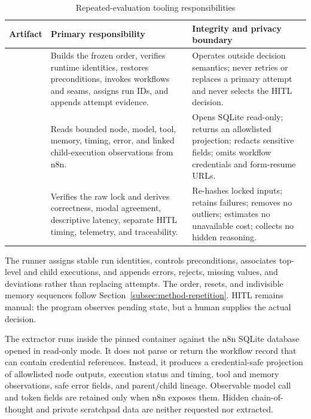 \begin{table}[H]
\centering
\caption{Repeated-evaluation tooling responsibilities}
\label{tab:impl-evaluation-tools}

\begingroup
\small
\setlength{\tabcolsep}{4pt}
\renewcommand{\arraystretch}{1.15}

\begin{tabularx}{\textwidth}{
  @{}
  L{0.23\textwidth}
  L{0.34\textwidth}
  Y
  @{}
}
\toprule
\textbf{Artifact}
&
\textbf{Primary responsibility}
&
\textbf{Integrity and privacy boundary}
\\
\midrule

&
Builds the frozen order, verifies runtime identities, restores
preconditions, invokes workflows and seams, assigns run IDs, and
appends attempt evidence.
&
Operates outside decision semantics; never retries or replaces a primary
attempt and never selects the HITL decision.
\\
\addlinespace[2pt]

&
Reads bounded node, model, tool, memory, timing, error, and linked
child-execution observations from n8n.
&
Opens SQLite read-only; returns an allowlisted projection; redacts
sensitive fields; omits workflow credentials and form-resume URLs.
\\
\addlinespace[2pt]

&
Verifies the raw lock and derives correctness, modal agreement,
descriptive latency, separate HITL timing, telemetry, and traceability.
&
Re-hashes locked inputs; retains failures; removes no outliers;
estimates no unavailable cost; collects no hidden reasoning.
\\

\bottomrule
\end{tabularx}
\endgroup
\end{table}

The runner assigns stable run identities, controls preconditions, associates
top-level and child executions, and appends errors, rejects, missing values, and
deviations rather than replacing attempts. The order, resets, and indivisible
memory sequences follow Section~\ref{subsec:method-repetition}. HITL remains
manual: the program observes pending state, but a human supplies the actual
decision.

The extractor runs inside the pinned container against the n8n SQLite database
opened in read-only mode. It does not parse or return the workflow record that
can contain credential references. Instead, it produces a credential-safe
projection of allowlisted node outputs, execution status and timing, tool and
memory observations, safe error fields, and parent/child lineage. Observable
model call and token fields are retained only when n8n exposes them. Hidden
chain-of-thought and private scratchpad data are neither requested nor
extracted.

